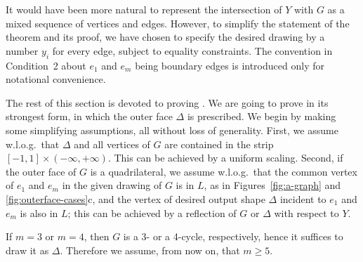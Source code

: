 It would have been more natural to represent the intersection of $Y$ with $G$
as a mixed sequence of vertices and edges. However, to simplify the
statement of the theorem and its proof, we have chosen to specify the
desired drawing by a number $y_i$ for every edge, subject to equality
constraints. %
The convention in Condition~2 about $e_1$ and $e_m$ being boundary
edges is introduced only for
 notational convenience.

The rest of this section is devoted to proving . We
are going to prove  in its strongest form, in which the
outer face $\Delta$ is prescribed.  We begin by making some simplifying
assumptions, all without loss of generality.
%
%
%
First, we assume w.l.o.g.\ that $\Delta$ and all vertices of $G$
are contained in the strip $[-1,1]\times(-\infty,+\infty)$.  This can
be achieved by a uniform scaling.  Second, if the outer face of $G$
is a quadrilateral, we assume w.l.o.g.\ that the common vertex
of $e_1$ and $e_m$ in the given drawing of $G$ is in $L$, as in
Figures~\ref{fig:a-graph} and \ref{fig:outerface-cases}c, and the
vertex of desired output shape $\Delta$ incident to $e_1$ and $e_m$
is also in $L$; this can be achieved by a reflection of $G$ or $\Delta$
with respect to $Y$.



If $m=3$ or $m=4$, then $G$ is a 3- or a 4-cycle, respectively, hence it suffices to draw it as $\Delta$. Therefore we assume, from now on, that $m\ge 5$.  

